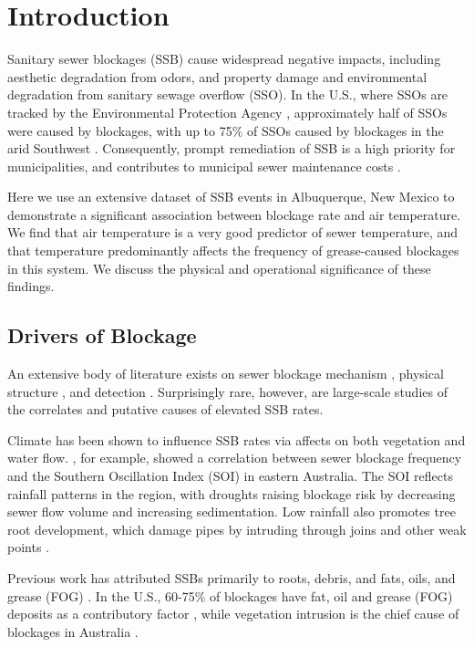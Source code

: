 \documentclass[letterpaper,12pt]{article}
\begin{document}
\section{Introduction}
Sanitary sewer blockages (SSB) cause widespread negative impacts, including
aesthetic degradation from odors, and property damage and environmental
degradation from sanitary sewage overflow (SSO).  In the U.S., where SSOs are
tracked by the Environmental Protection Agency \cite{epa2004local},
approximately half of SSOs were caused by blockages, with up to 75\% of SSOs
caused by blockages in the arid Southwest \cite{epa2004report}.
Consequently, prompt remediation of SSB is a high priority for municipalities,
and contributes to municipal sewer maintenance costs
\cite{maintenance-cost}.

Here we use an extensive dataset of SSB events in
Albuquerque, New Mexico to demonstrate a significant association
between blockage rate and air temperature.
We find that air temperature is a very good predictor 
of sewer temperature, and that
temperature predominantly affects the 
frequency of grease-caused blockages in this system.
We discuss the physical and operational significance of 
these findings.

\subsection{Drivers of Blockage}
An extensive body of literature exists on sewer blockage 
mechanism \citep{??}, physical structure \citep{??}, and 
detection \citep{??}.  Surprisingly rare, however, are 
large-scale 
studies of the correlates and putative causes of elevated
SSB rates. 

Climate has been shown to influence SSB rates via affects on both vegetation and water
flow. \cite{Marlow2011}, for example, showed a correlation between sewer
blockage frequency and the Southern Oscillation Index (SOI) in eastern
Australia. The SOI reflects rainfall patterns in the region, with droughts
raising blockage risk by decreasing sewer flow volume and increasing
sedimentation. Low rainfall also promotes tree root development, which damage
pipes by intruding through joins and other weak points \cite{Desilva2011}.

Previous work has attributed SSBs primarily to roots, debris, and fats, oils,
and grease (FOG) \cite{epa2004report}.  In the U.S., 60-75\% of blockages
have fat, oil and grease (FOG) deposits as a contributory factor
\cite{Keener2008}, while vegetation intrusion is the chief cause of
blockages in Australia \cite{Marlow2011}.
\end{document}

